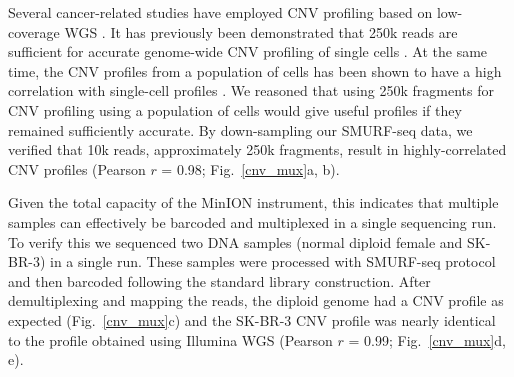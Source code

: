 Several cancer-related studies have employed CNV profiling based on
low-coverage WGS \cite{macintyre2018copy,kader2016copy}.  It has
previously been demonstrated that 250k reads are sufficient for accurate
genome-wide CNV profiling of single cells \cite{baslan2015optimizing}.
At the same time, the CNV profiles from a population of cells has been
shown to have a high correlation with single-cell profiles
\cite{navin2011tumour,baslan2015optimizing}. We reasoned that using 250k
fragments for CNV profiling using a population of cells would give
useful profiles if they remained sufficiently accurate.  By
down-sampling our SMURF-seq data, we verified that 10k reads,
approximately 250k fragments, result in highly-correlated CNV profiles
(Pearson $r$ = 0.98; Fig.~\ref{cnv_mux}a, b).

Given the total capacity of the MinION instrument, this indicates that
multiple samples can effectively be barcoded and multiplexed in a single
sequencing run.
To verify this we sequenced two DNA samples (normal diploid female and
SK-BR-3) in a single run.  These samples were processed with SMURF-seq
protocol and then barcoded following the standard library construction.
After demultiplexing and mapping the reads, the diploid genome had a CNV
profile as expected (Fig.~\ref{cnv_mux}c) and the SK-BR-3 CNV profile
was nearly identical to the profile obtained using Illumina WGS (Pearson
$r$ = 0.99; Fig.~\ref{cnv_mux}d, e).
